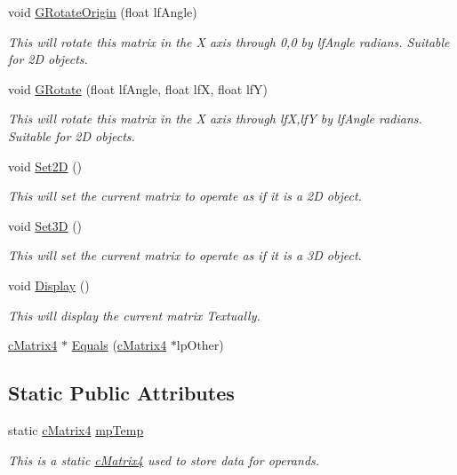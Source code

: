 \begin{DoxyCompactItemize}
void \hyperlink{classc_matrix4_a04a196147274eb6b3d1aca1782c26091}{GRotateOrigin} (float lfAngle)
\begin{DoxyCompactList}\small\item\em This will rotate this matrix in the X axis through 0,0 by lfAngle radians. Suitable for 2D objects. \item\end{DoxyCompactList}\item 
void \hyperlink{classc_matrix4_a5115db44a0c51d97be3d5791fb19d18a}{GRotate} (float lfAngle, float lfX, float lfY)
\begin{DoxyCompactList}\small\item\em This will rotate this matrix in the X axis through lfX,lfY by lfAngle radians. Suitable for 2D objects. \item\end{DoxyCompactList}\item 
void \hyperlink{classc_matrix4_ad24236403317622459c3309938be9d21}{Set2D} ()
\begin{DoxyCompactList}\small\item\em This will set the current matrix to operate as if it is a 2D object. \item\end{DoxyCompactList}\item 
void \hyperlink{classc_matrix4_a746ce09337cbf6a3292cbe15991efd79}{Set3D} ()
\begin{DoxyCompactList}\small\item\em This will set the current matrix to operate as if it is a 3D object. \item\end{DoxyCompactList}\item 
void \hyperlink{classc_matrix4_a9f75b6af81c8cc0de8168d4179e362d1}{Display} ()
\begin{DoxyCompactList}\small\item\em This will display the current matrix Textually. \item\end{DoxyCompactList}\item 
\hyperlink{classc_matrix4}{cMatrix4} $\ast$ \hyperlink{classc_matrix4_accc00afa5ecbdbe0b4db65e345adc6db}{Equals} (\hyperlink{classc_matrix4}{cMatrix4} $\ast$lpOther)
\end{DoxyCompactItemize}
\subsection*{Static Public Attributes}
\begin{DoxyCompactItemize}
\item 
static \hyperlink{classc_matrix4}{cMatrix4} \hyperlink{classc_matrix4_a93af3ea9ca6f3d38ad65b8ebc75ed7ba}{mpTemp}
\begin{DoxyCompactList}\small\item\em This is a static \hyperlink{classc_matrix4}{cMatrix4} used to store data for operands. \item\end{DoxyCompactList}\end{DoxyCompactItemize}
